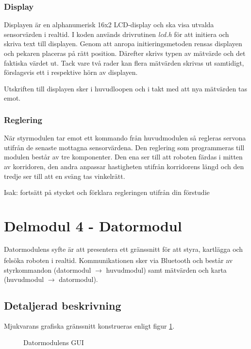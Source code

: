 \documentclass[11pt]{article}
\begin{document}
\begin{flushleft}
\subsubsection{Display}
Displayen är en alphanumerisk 16x2 LCD-display och ska visa utvalda sensorvärden i realtid. I koden används drivrutinen \emph{lcd.h} för att initiera och skriva text till displayen. Genom att anropa initieringsmetoden rensas displayen och pekaren placeras på rätt position. Därefter skrivs typen av mätvärde och det faktiska värdet ut. Tack vare två rader kan flera mätvärden skrivas ut samtidigt, förslagsvis ett i respektive hörn av displayen.

Utskriften till displayen sker i huvudloopen och i takt med att nya mätvärden tas emot.

\subsubsection{Reglering} \label{mjukvarureglering}
När styrmodulen tar emot ett kommando från huvudmodulen så regleras servona utifrån de senaste mottagna sensorvärdena. Den reglering som programmeras till modulen består av tre komponenter. Den ena ser till att roboten färdas i mitten av korridoren, den andra anpassar hastigheten utifrån korridorens längd och den tredje ser till att en sväng tas vinkelrätt.

Isak: fortsätt på stycket och förklara regleringen utifrån din förstudie

\pagebreak
\section{Delmodul 4 - Datormodul}
Datormodulens syfte är att presentera ett gränssnitt för att styra, kartlägga och felsöka roboten i realtid. Kommunikationen sker via Bluetooth\textsuperscript{\circledR} och består av styrkommandon (datormodul $\rightarrow$ huvudmodul) samt mätvärden och karta (huvudmodul $\rightarrow$ datormodul). 

\subsection{Detaljerad beskrivning}
Mjukvarans grafiska gränssnitt konstrueras enligt figur \ref{datormodul:software}.

\begin{figure}[htbp]
\centering
\noindent\resizebox{.5\linewidth}{!}{
	}
	\caption{Datormodulens GUI \label{datormodul:software}}	
\end{figure}


\end{flushleft}
\end{document}
